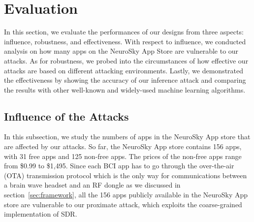 \section{Evaluation}
\label{sec:performance}

In this section, we evaluate the performances of our designs from three aspects: influence, robustness, and effectiveness. With respect to influence, we conducted analysis on how many apps on the NeuroSky App Store are vulnerable to our attacks. As for robustness, we probed into the circumstances of how effective our attacks are based on different attacking environments. Lastly, we demonstrated the effectiveness by showing the accuracy of our inference attack and comparing the results with other well-known and widely-used machine learning algorithms.

\subsection{Influence of the Attacks}
In this subsection, we study the numbers of apps in the NeuroSky App store that are affected by our attacks. So far, the NeuroSky App store contains 156 apps, with 31 free apps and 125 non-free apps. The prices of the non-free apps range from \$0.99 to \$1,495. Since each BCI app has to go through the over-the-air (OTA) transmission protocol which is the only way for communications between a brain wave headset and an RF dongle as we discussed in section~\ref{sec:framework}, all the 156 apps publicly available in the NeuroSky App store are vulnerable to our proximate attack, which exploits the coarse-grained implementation of SDR.\\
%
